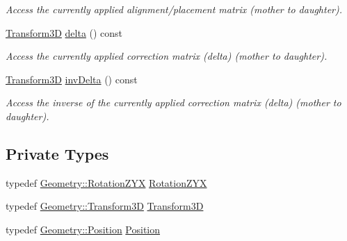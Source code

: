 \begin{DoxyCompactItemize}
\begin{DoxyCompactList}\small\item\em Access the currently applied alignment/placement matrix (mother to daughter). \item\end{DoxyCompactList}\item 
\hyperlink{class_d_d4hep_1_1_alignments_1_1_global_alignment_a328240cbc53ba92424336a5898ba49d3}{Transform3D} \hyperlink{class_d_d4hep_1_1_alignments_1_1_global_alignment_a3b392c1322cd9b4b9166aff9a116517c}{delta} () const 
\begin{DoxyCompactList}\small\item\em Access the currently applied correction matrix (delta) (mother to daughter). \item\end{DoxyCompactList}\item 
\hyperlink{class_d_d4hep_1_1_alignments_1_1_global_alignment_a328240cbc53ba92424336a5898ba49d3}{Transform3D} \hyperlink{class_d_d4hep_1_1_alignments_1_1_global_alignment_a8e320407ca494e5b3a8bfb1bb13bfad7}{invDelta} () const 
\begin{DoxyCompactList}\small\item\em Access the inverse of the currently applied correction matrix (delta) (mother to daughter). \item\end{DoxyCompactList}\end{DoxyCompactItemize}
\subsection*{Private Types}
\begin{DoxyCompactItemize}
\item 
typedef \hyperlink{namespace_d_d4hep_1_1_geometry_a24667b2b9c3cec3d5239828db4d52189}{Geometry::RotationZYX} \hyperlink{class_d_d4hep_1_1_alignments_1_1_global_alignment_af30b8cf1e2dbdfb67f6819ef88e02478}{RotationZYX}
\item 
typedef \hyperlink{namespace_d_d4hep_1_1_geometry_aeb4c0356d12fd7be49a0aae50514e64b}{Geometry::Transform3D} \hyperlink{class_d_d4hep_1_1_alignments_1_1_global_alignment_a328240cbc53ba92424336a5898ba49d3}{Transform3D}
\item 
typedef \hyperlink{namespace_d_d4hep_1_1_geometry_a55083902099d03506c6db01b80404900}{Geometry::Position} \hyperlink{class_d_d4hep_1_1_alignments_1_1_global_alignment_a9cd5167ec3a33a95ca76a9c7fe06271e}{Position}
\end{DoxyCompactItemize}


